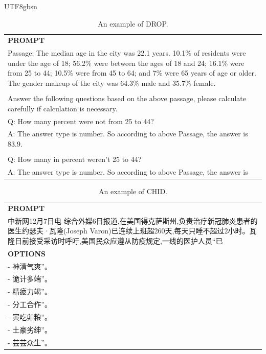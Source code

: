 \documentclass[11pt, a4paper, logo, copyright, nonumbering]{deepseek}
\begin{document}
\begin{CJK*}{UTF8}{gbsn}
\begin{table}[h]
    \centering \small
\begin{tabular}{p{12cm}}
\toprule
\textbf{PROMPT}\\
Passage: The median age in the city was 22.1 years. 10.1\% of residents were under the age of 18; 56.2\% were between the ages of 18 and 24; 16.1\% were from 25 to 44; 10.5\% were from 45 to 64; and 7\% were 65 years of age or older. The gender makeup of the city was 64.3\% male and 35.7\% female.
\\
\\Answer the following questions based on the above passage, please calculate carefully if calculation is necessary.
\\Q: How many percent were not from 25 to 44?
\\A: The answer type is number. So according to above Passage, the answer is 83.9.
\\
\\Q: How many in percent weren't 25 to 44?
\\A: The answer type is number. So according to above Passage, the answer is\\
\bottomrule
\end{tabular}
    \caption{\centering An example of DROP.}
    \label{tab:drop_eval_format_example}
\end{table}

\begin{table}[h]
    \centering \small
\begin{tabular}{p{12cm}}
\toprule
\textbf{PROMPT}\\
中新网12月7日电 综合外媒6日报道,在美国得克萨斯州,负责治疗新冠肺炎患者的医生约瑟夫·瓦隆(Joseph Varon)已连续上班超260天,每天只睡不超过2小时。瓦隆日前接受采访时呼吁,美国民众应遵从防疫规定,一线的医护人员“已\\
\midrule
\textbf{OPTIONS}\\
- 神清气爽”。\\
- 诡计多端”。\\
- 精疲力竭”。\\
- 分工合作”。\\
- 寅吃卯粮”。\\
- 土豪劣绅”。\\
- 芸芸众生”。\\
\bottomrule
\end{tabular}
    \caption{\centering An example of CHID.}
    \label{tab:chid_eval_format_example}
\end{table}


\end{CJK*}
\end{document}
